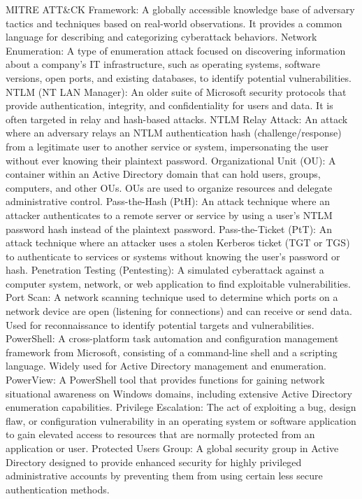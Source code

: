 MITRE ATT\&CK Framework: A globally accessible knowledge base of adversary tactics and techniques based on real-world observations. It provides a common language for describing and categorizing cyberattack behaviors.
Network Enumeration: A type of enumeration attack focused on discovering information about a company's IT infrastructure, such as operating systems, software versions, open ports, and existing databases, to identify potential vulnerabilities.
NTLM (NT LAN Manager): An older suite of Microsoft security protocols that provide authentication, integrity, and confidentiality for users and data. It is often targeted in relay and hash-based attacks.
NTLM Relay Attack: An attack where an adversary relays an NTLM authentication hash (challenge/response) from a legitimate user to another service or system, impersonating the user without ever knowing their plaintext password.
Organizational Unit (OU): A container within an Active Directory domain that can hold users, groups, computers, and other OUs. OUs are used to organize resources and delegate administrative control.
Pass-the-Hash (PtH): An attack technique where an attacker authenticates to a remote server or service by using a user's NTLM password hash instead of the plaintext password.
Pass-the-Ticket (PtT): An attack technique where an attacker uses a stolen Kerberos ticket (TGT or TGS) to authenticate to services or systems without knowing the user's password or hash.
Penetration Testing (Pentesting): A simulated cyberattack against a computer system, network, or web application to find exploitable vulnerabilities.
Port Scan: A network scanning technique used to determine which ports on a network device are open (listening for connections) and can receive or send data. Used for reconnaissance to identify potential targets and vulnerabilities.
PowerShell: A cross-platform task automation and configuration management framework from Microsoft, consisting of a command-line shell and a scripting language. Widely used for Active Directory management and enumeration.
PowerView: A PowerShell tool that provides functions for gaining network situational awareness on Windows domains, including extensive Active Directory enumeration capabilities.
Privilege Escalation: The act of exploiting a bug, design flaw, or configuration vulnerability in an operating system or software application to gain elevated access to resources that are normally protected from an application or user.
Protected Users Group: A global security group in Active Directory designed to provide enhanced security for highly privileged administrative accounts by preventing them from using certain less secure authentication methods.
